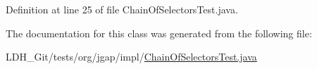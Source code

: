 Definition at line 25 of file Chain\-Of\-Selectors\-Test.\-java.



The documentation for this class was generated from the following file\-:\begin{DoxyCompactItemize}
\item 
L\-D\-H\-\_\-\-Git/tests/org/jgap/impl/\hyperlink{_chain_of_selectors_test_8java}{Chain\-Of\-Selectors\-Test.\-java}\end{DoxyCompactItemize}
